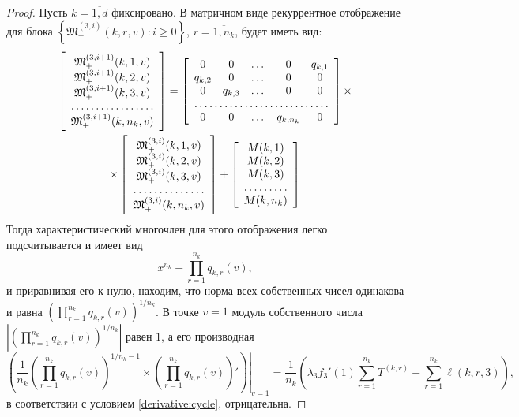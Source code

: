 \documentclass[a4paper,12pt,russian]{extarticle}
\begin{document}
\begin{proof}
Пусть $k =\overline{1,d}$ фиксировано. В матричном виде рекуррентное отображение для блока $\left\{\mathfrak{M}_+^{(3,i)}(k,r,v)\colon i \geqslant 0\right\}$, $r =\overline{1,n_k}$, будет иметь вид:
\begin{multline*}
\left[ \begin{array}{c}
    \mathfrak{M}_+^{(3,i+1)}(k,1,v) \\
    \mathfrak{M}_+^{(3,i+1)}(k,2,v) \\
    \mathfrak{M}_+^{(3,i+1)}(k,3,v) \\
    \hdotsfor{1} \\
    \mathfrak{M}_+^{(3,i+1)}(k,n_k,v)
\end{array}\right]
=
\left[ \begin{array}{c c c c c c}
    0       & 0  & \dots & 0 &   q_{k,1} \\
    q_{k,2}       & 0  & \dots & 0 & 0 \\
    0       & q_{k,3}  & \dots  &0  & 0 \\
    \hdotsfor{5} \\
    0       & 0  & \dots &  q_{k,n_k} & 0 \\
\end{array}\right]
\times \\ \times
\left[ \begin{array}{c}
    \mathfrak{M}_+^{(3,i)}(k,1,v) \\
    \mathfrak{M}_+^{(3,i)}(k,2,v) \\
    \mathfrak{M}_+^{(3,i)}(k,3,v) \\
    \hdotsfor{1} \\
    \mathfrak{M}_+^{(3,i)}(k,n_k,v)\\
\end{array}\right]
+
\left[ \begin{array}{c}
    M(k,1) \\
    M(k,2) \\
    M(k,3) \\
    \hdotsfor{1} \\
    M(k,n_k) \\
\end{array}\right]
\end{multline*}
Тогда характеристический многочлен для этого отображения легко подсчитывается и имеет вид 
$$
x^{n_k} - \prod_{r=1}^{n_k}q_{k,r} (v),
$$
и приравнивая его к нулю, находим, что норма всех собственных чисел одинакова и равна $\left(\prod_{r=1}^{n_k}q_{k,r} (v)\right)^{1/n_k}$. В точке $v=1$ модуль собственного числа $|\left(\prod_{r=1}^{n_k}q_{k,r} (v)\right)^{1/n_k}|$ равен $1$, а его производная
\begin{equation*}
\left(\frac{1}{n_k} \left.\left(\prod_{r=1}^{n_k}q_{k,r} (v)\right)^{1/n_k - 1} \times \left(\prod_{r=1}^{n_k}q_{k,r}(v)\right) '  \right)\right|_{v=1}=\frac{1}{n_k} \left(\lambda_3 f_3'(1) \sum_{r=1}^{n_k} T^{(k,r)} -\sum_{r=1}^{n_k} \ell(k,r,3)\right),
\end{equation*}
в соответствии с условием \eqref{derivative:cycle}, отрицательна.


\end{proof}
\end{document}
